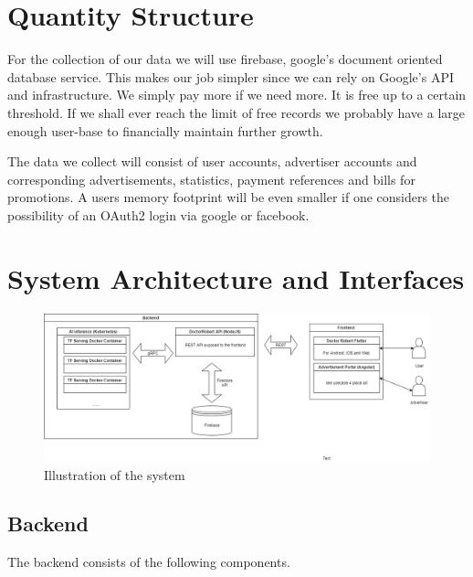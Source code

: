 \documentclass[12pt]{article}
\theoremstyle{definition}
\begin{document}
\pagebreak

\section{Quantity Structure}

For the collection of our data we will use firebase, google's document oriented database service. This makes our job simpler since we can rely on Google's API and infrastructure. We simply pay more if we need more. It is free up to a certain threshold. If we shall ever reach the limit of free records we probably have a large enough user-base to financially maintain further growth. 

The data we collect will consist of user accounts, advertiser accounts and corresponding advertisements, statistics, payment references and bills for promotions. A users memory footprint will be even smaller if one considers the possibility of an OAuth2 login via google or facebook.

\pagebreak

\section{System Architecture and Interfaces}

\begin{figure}[H]
    \centering
    \includegraphics[scale=0.4]{SystemSpec/Usecases/Diagrams/DoctorRobertArchitecture.png}
    \caption{Illustration of the system}
    \label{fig:my_label}
\end{figure}



\subsection{Backend}

The backend consists of the following components.
\end{document}
